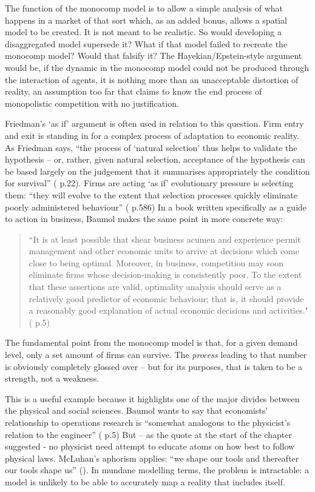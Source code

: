 The function of the \gls{monocomp} model is to allow a simple analysis of what happens in a market of that sort which, as an added bonus, allows a spatial model to be created. It is not meant to be realistic. So would developing a disaggregated model supersede it? What if that model failed to recreate the \gls{monocomp} model? Would that falsify it? The Hayekian/Epstein-style argument would be, if the dynamic in the \gls{monocomp} model could not be produced through the interaction of agents, it is nothing more than an unacceptable distortion of reality, an assumption too far that claims to know the end process of monopolistic competition with no justification.

Friedman's `as if' argument is often used in relation to this question. Firm entry and exit is standing in for a complex process of adaptation to economic reality. As Friedman says, ``the process of `natural selection' thus helps to validate the hypothesis – or, rather, given natural selection, acceptance of the hypothesis can be based largely on the judgement that it summarises appropriately the condition for survival'' (\citealt{friedman_essays_1953} p.22). Firms are acting `as if' evolutionary pressure is selecting them: ``they will evolve to the extent that selection processes quickly eliminate poorly administered behaviour'' (\citealt{heiner_origin_1983} p.586) In a book written specifically as a guide to action in business, Baumol makes the same point in more concrete way: 

\begin{quote}
``It is at least possible that shear business acumen and experience permit management and other economic units to arrive at decisions which come close to being optimal. Moreover, in business, competition may soon eliminate firms whose decision-making is consistently poor. To the extent that these assertions are valid, optimality analysis should serve as a relatively good predictor of economic behaviour; that is, it should provide a reasonably good explanation of actual economic decisions and activities." (\citealt{baumol_economic_1976} p.5)
\end{quote}

The fundamental point from the \gls{monocomp} model is that, for a given demand level, only a set amount of firms can survive. The \emph{process} leading to that number is obviously completely glossed over – but for its purposes, that is taken to be a strength, not a weakness. 

This is a useful example because it highlights one of the major divides between the physical and social sciences. Baumol wants to say that economists' relationship to operations research is ``somewhat analogous to the physicist's relation to the engineer'' (\citealt{baumol_economic_1976} p.5) But – as the quote at the start of the chapter suggested - no physicist need attempt to educate atoms on how best to follow physical laws. McLuhan's aphorism applies: ``we shape our tools and thereafter our tools shape us'' (\citealt{mcluhan_understanding_1964}). In mundane modelling terms, the problem is intractable: a model is unlikely to be able to accurately map a reality that includes itself.

